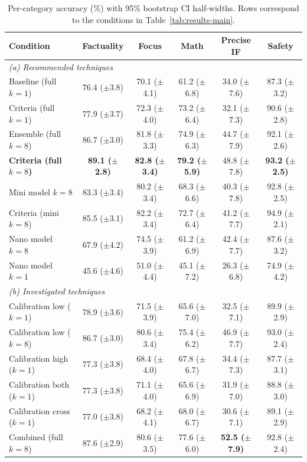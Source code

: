 \documentclass{article}
\begin{document}
\begin{table}[ht]
\centering
\caption{Per-category accuracy (\%) with 95\% bootstrap CI half-widths. Rows correspond to the conditions in Table~\ref{tab:results-main}.}
\label{tab:per-cat-ci}
\footnotesize
\begin{tabular}{lccccc}
\toprule
Condition & Factuality & Focus & Math & Precise IF & Safety \\
\midrule
\multicolumn{6}{l}{\textit{(a) Recommended techniques}} \\
\midrule
Baseline (full $k{=}1$)          & 76.4 ($\pm$3.8) & 70.1 ($\pm$4.1) & 61.2 ($\pm$6.8) & 34.0 ($\pm$7.6) & 87.3 ($\pm$3.2) \\
Criteria (full $k{=}1$)          & 77.9 ($\pm$3.7) & 72.3 ($\pm$4.0) & 73.2 ($\pm$6.4) & 32.1 ($\pm$7.3) & 90.6 ($\pm$2.8) \\
Ensemble (full $k{=}8$)          & 86.7 ($\pm$3.0) & 81.8 ($\pm$3.3) & 74.9 ($\pm$6.3) & 44.7 ($\pm$7.9) & 92.1 ($\pm$2.6) \\
\textbf{Criteria (full $k{=}8$)} & \textbf{89.1 ($\pm$2.8)} & \textbf{82.8 ($\pm$3.4)} & \textbf{79.2 ($\pm$5.9)} & 48.8 ($\pm$7.8) & \textbf{93.2 ($\pm$2.5)} \\
Mini model $k{=}8$               & 83.3 ($\pm$3.4) & 80.2 ($\pm$3.4) & 68.3 ($\pm$6.6) & 40.3 ($\pm$7.8) & 92.8 ($\pm$2.5) \\
Criteria (mini $k{=}8$)          & 85.5 ($\pm$3.1) & 82.2 ($\pm$3.4) & 72.7 ($\pm$6.4) & 41.2 ($\pm$7.7) & 94.9 ($\pm$2.1) \\
Nano model $k{=}8$               & 67.9 ($\pm$4.2) & 74.5 ($\pm$3.9) & 61.2 ($\pm$6.9) & 42.4 ($\pm$7.7) & 87.6 ($\pm$3.2) \\
Nano model $k{=}1$               & 45.6 ($\pm$4.6) & 51.0 ($\pm$4.4) & 45.1 ($\pm$7.2) & 26.3 ($\pm$6.8) & 74.9 ($\pm$4.2) \\
\midrule
\multicolumn{6}{l}{\textit{(b) Investigated techniques}} \\
\midrule
Calibration low ($k{=}1$)              & 78.9 ($\pm$3.6) & 71.5 ($\pm$3.9) & 65.6 ($\pm$7.0) & 32.5 ($\pm$7.1) & 89.9 ($\pm$2.9) \\
Calibration low ($k{=}8$)              & 86.7 ($\pm$3.0) & 80.6 ($\pm$3.4) & 75.4 ($\pm$6.2) & 46.9 ($\pm$7.7) & 93.0 ($\pm$2.4) \\
Calibration high ($k{=}1$)             & 77.3 ($\pm$3.8) & 68.4 ($\pm$4.0) & 67.8 ($\pm$6.7) & 34.4 ($\pm$7.3) & 87.7 ($\pm$3.1) \\
Calibration both ($k{=}1$)             & 77.3 ($\pm$3.8) & 71.1 ($\pm$4.0) & 65.6 ($\pm$6.9) & 31.9 ($\pm$7.0) & 88.8 ($\pm$3.0) \\
Calibration cross ($k{=}1$)            & 77.0 ($\pm$3.8) & 68.2 ($\pm$4.1) & 68.0 ($\pm$6.7) & 30.6 ($\pm$7.1) & 89.1 ($\pm$2.9) \\
Combined (full $k{=}8$)          & 87.6 ($\pm$2.9) & 80.6 ($\pm$3.5) & 77.6 ($\pm$6.0) & \textbf{52.5 ($\pm$7.9)} & 92.8 ($\pm$2.4) \\
\bottomrule
\end{tabular}
\end{table}
\end{document}
